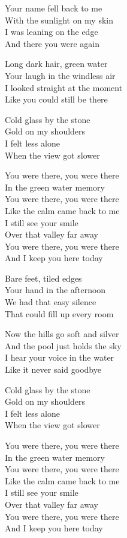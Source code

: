 \begin{lyrics}
Your name fell back to me\\
With the sunlight on my skin\\
I was leaning on the edge\\
And there you were again

Long dark hair, green water\\
Your laugh in the windless air\\
I looked straight at the moment\\
Like you could still be there

Cold glass by the stone\\
Gold on my shoulders\\
I felt less alone\\
When the view got slower

You were there, you were there\\
In the green water memory\\
You were there, you were there\\
Like the calm came back to me\\
I still see your smile\\
Over that valley far away\\
You were there, you were there\\
And I keep you here today

Bare feet, tiled edges\\
Your hand in the afternoon\\
We had that easy silence\\
That could fill up every room

Now the hills go soft and silver\\
And the pool just holds the sky\\
I hear your voice in the water\\
Like it never said goodbye

Cold glass by the stone\\
Gold on my shoulders\\
I felt less alone\\
When the view got slower

You were there, you were there\\
In the green water memory\\
You were there, you were there\\
Like the calm came back to me\\
I still see your smile\\
Over that valley far away\\
You were there, you were there\\
And I keep you here today


\end{lyrics}
